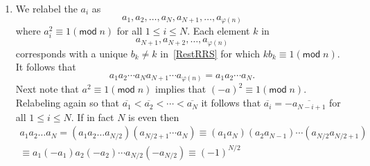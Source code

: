 \documentclass[12pt]{article}
\renewcommand{\pmod}[1]{\left(\mathsf{mod}\;#1\right)}
\begin{document}
\begin{enumerate}
\item %
We relabel the $a_i$ as
\[a_1,a_2,\ldots,a_N,a_{N+1},\ldots,a_{\varphi\left(n\right)}\]
where $a_i^2\equiv 1\pmod{n}$ for all $1\le i\le N$.
Each element $k$ in
\begin{equation}\label{RestRRS}
a_{N+1},a_{N+2},\ldots,a_{\varphi\left(n\right)}
\end{equation}
corresponds with a unique $b_k\ne k$ in~\autoref{RestRRS}
for which $kb_k\equiv 1\pmod{n}$. It follows that
\[a_1a_2\cdots a_Na_{N+1}\cdots a_{\varphi\left(n\right)}
=a_1a_2\cdots a_N.\]
Next note that $a^2\equiv 1\pmod{n}$ implies that
$\left(-a\right)^2\equiv 1\pmod{n}$. Relabeling again
so that $\overline{a_1}<\overline{a_2}<\cdots<\overline{a_N}$
it follows that
$\overline{a_i}=-\overline{a_{N-i+1}}$ for all $1\le i\le N$.
If in fact $N$ is even then
\begin{multline*}
a_1a_2\ldots a_N=\left(a_1a_2\ldots a_{N/2}\right)
\left(a_{N/2+1}\cdots a_N\right)
\equiv \left(a_1a_N\right)\left(a_2a_{N-1}\right)\cdots
\left(a_{N/2}a_{N/2+1}\right)\\
\equiv a_1\left(-a_1\right)a_2\left(-a_2\right)
\cdots a_{N/2}\left(-a_{N/2}\right)\equiv \left(-1\right)^{N/2}
\end{multline*}
\end{enumerate}
\end{document}
